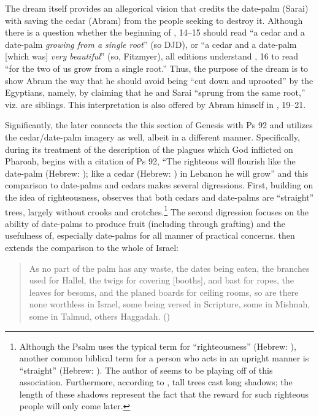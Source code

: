The dream itself provides an allegorical vision that credits the date-palm (Sarai) with saving the cedar (Abram) from the people seeking to destroy it. Although there is a question whether the beginning of , 14--15 should read  ``a cedar and a date-palm \emph{growing from a single root}'' (so DJD), or  ``a cedar and a date-palm [which was] \emph{very beautiful}'' (so, Fitzmyer), all editions understand , 16 to read  ``for the two of us grow from a single root.'' Thus, the purpose of the dream  is to show Abram the way that he should avoid being ``cut down and uprooted'' by the Egyptians, namely, by claiming that he and Sarai ``sprung from the same root,'' viz. are siblings. This interpretation is also offered by Abram himself in , 19--21.

Significantly, the later \GenRabbah connects the this section of Genesis with Ps 92 and utilizes the cedar/date-palm imagery as well, albeit in a different manner. Specifically, during its treatment of the description of the plagues which God inflicted on Pharoah, \GenRabbah begins with a citation of Ps 92, ``The righteous will flourish like the date-palm (Hebrew: ); like a cedar (Hebrew: ) in Lebanon he will grow'' and this comparison to date-palms and cedars makes several digressions. First, building on the idea of righteousness, \GenRabbah observes that both cedars and date-palms are ``straight'' trees, largely without crooks and crotches.\footnote{Although the Psalm uses the typical term for ``righteousness'' (Hebrew: ), another common biblical term for a person who acts in an upright manner is ``straight'' (Hebrew: ). The author of \GenRabbah seems to be playing off of this association. Furthermore, according to \GenRabbah, tall trees cast long shadows; the length of these shadows represent the fact that the reward for such righteous people will only come later.} The second digression focuses on the ability of date-palms to produce fruit (including through grafting) and the usefulness of, especially date-palms for all manner of practical concerns. \GenRabbah then extends the comparison to the whole of Israel:

\begin{quote}
As no part of the palm has any waste, the dates being eaten, the branches used for Hallel, the twigs for covering [booths], and bast for ropes, the leaves for besoms, and the planed boards for ceiling rooms, so are there none worthless in Israel, some being versed in Scripture, some in Mishnah, some in Talmud, others Haggadah. ()
\end{quote}

